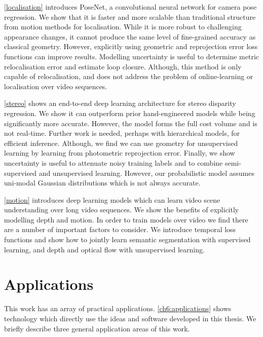 \cref{localisation} introduces PoseNet, a convolutional neural network for camera pose regression. We show that it is faster and more scalable than traditional structure from motion methods for localisation. While it is more robust to challenging appearance changes, it cannot produce the same level of fine-grained accuracy as classical geometry. However, explicitly using geometric and reprojection error loss functions can improve results. Modelling uncertainty is useful to determine metric relocalisation error and estimate loop closure. Although, this method is only capable of relocalisation, and does not address the problem of online-learning or localisation over video sequences.

\cref{stereo} shows an end-to-end deep learning architecture for stereo disparity regression. We show it can outperform prior hand-engineered models while being significantly more accurate. However, the model forms the full cost volume and is not real-time. Further work is needed, perhaps with hierarchical models, for efficient inference. Although, we find we can use geometry for unsupervised learning by learning from photometric reprojection error. Finally, we show uncertainty is useful to attenuate noisy training labels and to combine semi-supervised and unsupervised learning. However, our probabilistic model assumes uni-modal Gaussian distributions which is not always accurate.

\cref{motion} introduces deep learning models which can learn video scene understanding over long video sequences. We show the benefits of explicitly modelling depth and motion. In order to train models over video we find there are a number of important factors to consider. We introduce temporal loss functions and show how to jointly learn semantic segmentation with supervised learning, and depth and optical flow with unsupervised learning.

\section{Applications}

This work has an array of practical applications. \cref{ch6:applications} shows technology which directly use the ideas and software developed in this thesis. We briefly describe three general application areas of this work.

